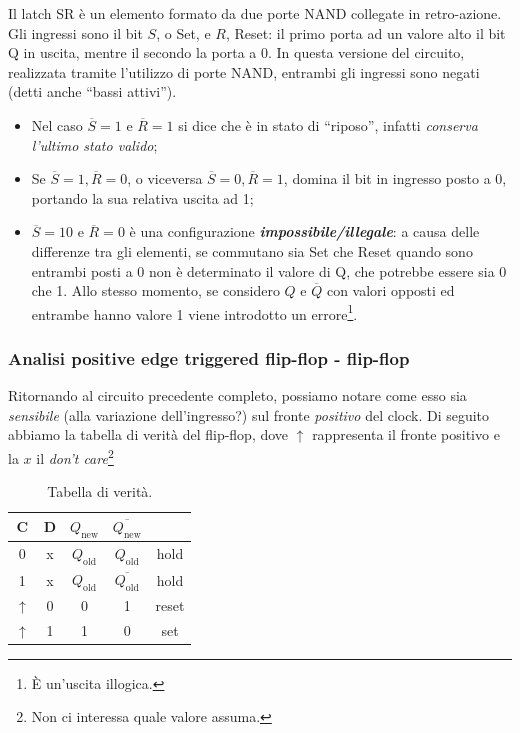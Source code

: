 \documentclass[
]{book}
\providecommand{\tightlist}{%
  \setlength{\itemsep}{0pt}\setlength{\parskip}{0pt}}
\begin{document}
Il latch SR è un elemento formato da due porte NAND collegate in
retro-azione. Gli ingressi sono il bit \(S\), o Set, e \(R\), Reset: il
primo porta ad un valore alto il bit Q in uscita, mentre il secondo la
porta a 0. In questa versione del circuito, realizzata tramite
l'utilizzo di porte NAND, entrambi gli ingressi sono negati (detti anche
``bassi attivi'').

\begin{itemize}
\tightlist
\item
  Nel caso \(\overline{S}=1\) e \(\overline{R}=1\) si dice che è in
  stato di ``riposo'', infatti \emph{conserva l'ultimo stato valido};
\item
  Se \(\overline{S}=1, \overline{R}=0\), o viceversa
  \(\overline{S}=0, \overline{R}=1\), domina il bit in ingresso posto a
  0, portando la sua relativa uscita ad 1;
\item
  \(\overline{S}=10\) e \(\overline{R}=0\) è una configurazione
  \textbf{\emph{impossibile/illegale}}: a causa delle differenze tra gli
  elementi, se commutano sia Set che Reset quando sono entrambi posti a
  0 non è determinato il valore di Q, che potrebbe essere sia 0 che 1.
  Allo stesso momento, se considero \(Q\) e \(\overline{Q}\) con valori
  opposti ed entrambe hanno valore 1 viene introdotto un
  errore\footnote{È un'uscita illogica.}.
\end{itemize}

\subsubsection{Analisi positive edge triggered flip-flop -
flip-flop}\label{analisi-positive-edge-triggered-flip-flop---flip-flop}

Ritornando al circuito precedente completo, possiamo notare come esso
sia \emph{sensibile} (alla variazione dell'ingresso?) sul fronte
\emph{positivo} del clock. Di seguito abbiamo la tabella di verità del
flip-flop, dove \(\uparrow\) rappresenta il fronte positivo e la \(x\)
il \emph{don't care}\footnote{Non ci interessa quale valore assuma.}

\begin{table}[H]
\centering
\begin{tabular}{cccc|c}
C & D & $Q_\text{new}$ & $\overline{Q_\text{new}}$ &  \\
\hline
0 & x & $Q_\text{old}$ & $Q_\text{old}$ & hold \\
1 & x & $Q_\text{old}$ & $\overline{Q_\text{old}}$ & hold \\
$\uparrow$ & 0 & 0 & 1 & reset \\
$\uparrow$ & 1 & 1 & 0 & set
\end{tabular}
\caption{Tabella di verità.}
\end{table}
\end{document}
